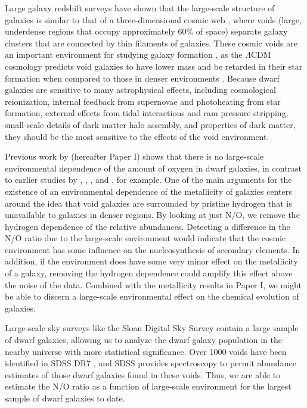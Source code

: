 Large galaxy redshift surveys have shown that the large-scale structure of 
galaxies is similar to that of a three-dimensional cosmic web \citep{Bond96}, 
where voids (large, underdense regions that occupy approximately 60\% of space) 
separate galaxy clusters that are connected by thin filaments of galaxies.  
These cosmic voids are an important environment for studying galaxy formation 
\citep[see][for a review]{vandeWeygaert11}, as the $\Lambda$CDM cosmology 
predicts void galaxies to have lower mass and be retarded in their star 
formation when compared to those in denser environments 
\citep[e.g.,][]{Gottlober03, Goldberg05, Cen11}.  Because dwarf galaxies are 
sensitive to many astrophysical effects, including cosmological reionization, 
internal feedback from supernovae and photoheating from star formation, external 
effects from tidal interactions and ram pressure stripping, small-scale details 
of dark matter halo assembly, and properties of dark matter, they should be the 
most sensitive to the effects of the void environment.  

Previous work by \cite{Douglass17a} (hereafter Paper I) shows that there is no 
large-scale environmental dependence of the amount of oxygen in dwarf galaxies, 
in contrast to earlier studies by \cite{Pustilnik06}, \cite{Cooper08}, 
\cite{Deng11}, and \cite{Filho15}, for example.  One of the main arguments for 
the existence of an environmental dependence of the metallicity of galaxies 
centers around the idea that void galaxies are surrounded by pristine hydrogen 
that is unavailable to galaxies in denser regions.  By looking at just N/O, we 
remove the hydrogen dependence of the relative abundances.  Detecting a 
difference in the N/O ratio due to the large-scale environment would indicate 
that the cosmic environment has some influence on the nucleosynthesis of 
secondary elements.  In addition, if the environment does have some very minor 
effect on the metallicity of a galaxy, removing the hydrogen dependence could 
amplify this effect above the noise of the data.  Combined with the metallicity 
results in Paper I, we might be able to discern a large-scale environmental 
effect on the chemical evolution of galaxies.

Large-scale sky surveys like the Sloan Digital Sky Survey 
\citep[SDSS;][]{Abazajian09} contain a large sample of dwarf galaxies, allowing 
us to analyze the dwarf galaxy population in the nearby universe with more 
statistical significance.  Over 1000 voids have been identified in SDSS DR7 
\citep{Pan12}, and SDSS provides spectroscopy to permit abundance estimates of 
those dwarf galaxies found in these voids.  Thus, we are able to estimate the 
N/O ratio as a function of large-scale environment for the largest sample of 
dwarf galaxies to date.

